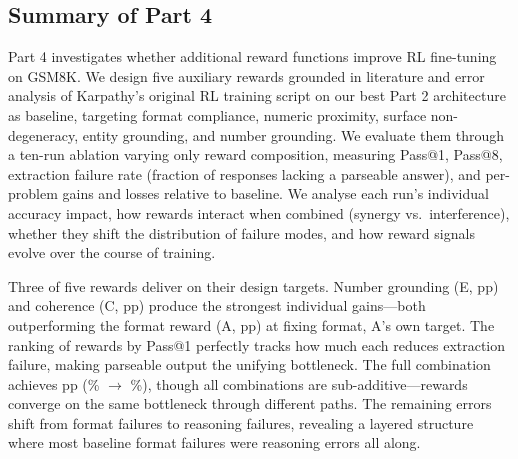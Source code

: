 \subsection{Summary of Part 4}
\nestindent

Part 4 investigates whether additional reward functions improve RL fine-tuning on GSM8K.
We design five auxiliary rewards grounded in literature and error analysis of Karpathy's original RL training script on our best Part 2 architecture as baseline, targeting format compliance, numeric proximity, surface non-degeneracy, entity grounding, and number grounding.
We evaluate them through a ten-run ablation varying only reward composition, measuring Pass@1, Pass@8, extraction failure rate (fraction of responses lacking a parseable answer), and per-problem gains and losses relative to baseline.
We analyse each run's individual accuracy impact, how rewards interact when combined (synergy vs.\ interference), whether they shift the distribution of failure modes, and how reward signals evolve over the course of training.

Three of five rewards deliver on their design targets.
Number grounding (E, \pFourSeparateEDeltaPassOne{}pp) and coherence (C, \pFourSeparateCDeltaPassOne{}pp) produce the strongest individual gains---both outperforming the format reward (A, \pFourSeparateADeltaPassOne{}pp) at fixing format, A's own target.
The ranking of rewards by Pass@1 perfectly tracks how much each reduces extraction failure, making parseable output the unifying bottleneck.
The full combination achieves \pFourCombinedAllDeltaPassOne{}pp (\pFourBaselinePassOne\% $\to$ \pFourCombinedAllPassOne\%), though all combinations are sub-additive---rewards converge on the same bottleneck through different paths.
The remaining errors shift from format failures to reasoning failures, revealing a layered structure where most baseline format failures were reasoning errors all along.

\nestunindent
